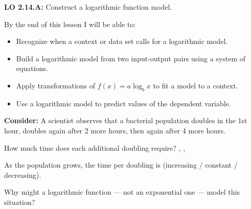 \documentclass[10pt]{article}
\begin{document}
\namedateperiod

\vspace{0.1in}

\begin{objectivebox}
\textbf{LO 2.14.A:} Construct a logarithmic function model.

By the end of this lesson I will be able to:
\begin{itemize}[leftmargin=1.5em,itemsep=3pt,topsep=3pt]
  \item Recognize when a context or data set calls for a logarithmic model.
  \item Build a logarithmic model from two input-output pairs using a system of equations.
  \item Apply transformations of $f(x) = a\log_b x$ to fit a model to a context.
  \item Use a logarithmic model to predict values of the dependent variable.
\end{itemize}
\end{objectivebox}

\vspace{0.08in}

\begin{vocabbox}
\end{vocabbox}

\vspace{0.08in}

\begin{hookbox}
\textbf{Consider:} A scientist observes that a bacterial population doubles in the 1st hour,
doubles again after 2 more hours, then again after 4 more hours.

\vspace{4pt}
How much time does each additional doubling require? \blank{2cm}, \blank{2cm}, \blank{2cm}

\vspace{4pt}
As the population grows, the time per doubling is \blank{4cm} (increasing / constant / decreasing).

\vspace{4pt}
Why might a logarithmic function --- not an exponential one --- model this situation?
\writeline
\end{hookbox}

\vspace{0.08in}
\end{document}
